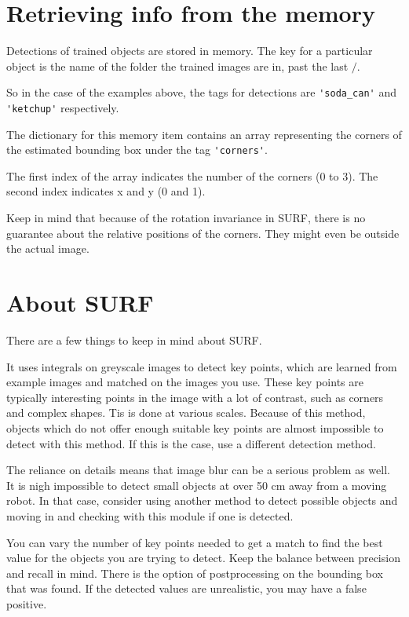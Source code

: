 \documentclass[a4paper, 12pt, oneside]{report}
\begin{document}
\section{Retrieving info from the memory}
Detections of trained objects are stored in memory. The key for a particular object is the name of the folder the trained images are in, past the last $/$.

So in the case of the examples above, the tags for detections are \verb='soda_can'= and \verb='ketchup'= respectively.

The dictionary for this memory item contains an array representing the corners of the estimated bounding box under the tag \verb='corners'=. 

The first index of the array indicates the number of the corners (0 to 3).
The second index indicates x and y (0 and 1).

Keep in mind that because of the rotation invariance in SURF, there is no guarantee about the relative positions of the corners. They might even be outside the actual image.

\section{About SURF}

There are a few things to keep in mind about SURF.

It uses integrals on greyscale images to detect key points, which are learned from example images and matched on the images you use.
These key points are typically interesting points in the image with a lot of contrast, such as corners and complex shapes.
Tis is done at various scales.
Because of this method, objects which do not offer enough suitable key points are almost impossible to detect with this method.
If this is the case, use a different detection method.

The reliance on details means that image blur can be a serious problem as well.
It is nigh impossible to detect small objects at over 50 cm away from a moving robot.
In that case, consider using another method to detect possible objects and moving in and checking with this module if one is detected.

You can vary the number of key points needed to get a match to find the best value for the objects you are trying to detect.
Keep the balance between precision and recall in mind.
There is the option of postprocessing on the bounding box that was found. 
If the detected values are unrealistic, you may have a false positive.
\end{document}
